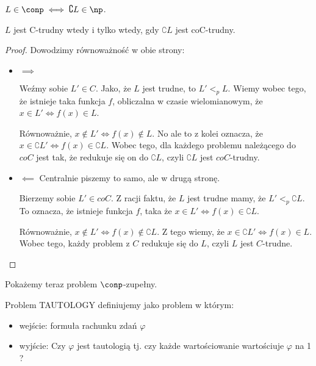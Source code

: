 \begin{definition}
	\(  L \in  \conp \iff \complement{L} \in \np \).
\end{definition}

\begin{lemma}
	\( L \) jest C-trudny wtedy i tylko wtedy, gdy \( \complement{L} \) jest  coC-trudny.
\end{lemma}

\begin{proof}

	Dowodzimy równoważność w obie strony:

	\begin{itemize}
		\item     \( \implies \)

		      Weźmy sobie \( L' \in C\). Jako, że \(L\) jest trudne, to \(L' <_{p} L\).  Wiemy wobec tego, że istnieje taka funkcja \(f\), obliczalna w czasie wielomianowym, że \( x \in L' \iff f(x) \in L\).

		      Równoważnie, \( x \not\in L' \iff f(x) \not \in L\). No ale to z kolei oznacza, że \( x \in \complement{L'} \iff f(x) \in \complement{L}\). Wobec tego, dla każdego problemu należącego do \(coC\) jest tak, że redukuje się on do \( \complement{L} \), czyli \(\complement{L}\) jest \(coC\)-trudny.

		\item \( \impliedby \)
		      Centralnie piszemy to samo, ale w drugą stronę.


		      Bierzemy sobie \( L' \in coC\). Z racji faktu, że \(L\) jest trudne mamy, że \(L' <_{p} \complement{L}\). To oznacza, że istnieje funkcja \(f\), taka że \( x \in L' \iff f(x) \in \complement{L} \).

		      Równoważnie, \( x \not \in L' \iff f(x) \not \in \complement{L} \). Z tego wiemy, że \( x \in \complement{L'} \iff f(x) \in L \). Wobec tego, każdy problem z \(C\) redukuje się do \(L\), czyli \(L\) jest \(C\)-trudne.


	\end{itemize}

\end{proof}


Pokażemy teraz problem \(\conp\)-zupełny.

\begin{definition}
	Problem \textsc{TAUTOLOGY} definiujemy jako problem w którym:
	\begin{itemize}
		\item wejście: formuła rachunku zdań \( \varphi \)
		\item wyjście: Czy \( \varphi \) jest tautologią tj. czy każde wartościowanie wartościuje \( \varphi \) na 1 ?
	\end{itemize}
\end{definition}

